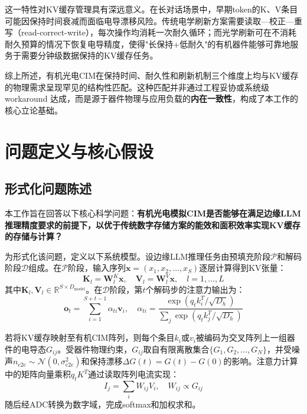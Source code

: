 这一特性对KV缓存管理具有深远意义。在长对话场景中，早期token的K、V条目可能因保持时间衰减而面临电导漂移风险。传统电学刷新方案需要读取—校正—重写（read-correct-write），每次操作均消耗一次耐久循环；而光学刷新可在不消耗耐久预算的情况下恢复电导精度，使得"长保持+低耐久"的有机器件能够可靠地服务于需要分钟级数据保持的KV缓存任务。

综上所述，有机光电CIM在保持时间、耐久性和刷新机制三个维度上均与KV缓存的物理需求呈现罕见的结构性匹配。这种匹配并非通过工程妥协或系统级 workaround 达成，而是源于器件物理与应用负载的\textbf{内在一致性}，构成了本工作的核心立论基础。


\section{问题定义与核心假设}
\label{sec:work2_problem}

\subsection{形式化问题陈述}

本工作旨在回答以下核心科学问题：\textbf{有机光电模拟CIM是否能够在满足边缘LLM推理精度要求的前提下，以优于传统数字存储方案的能效和面积效率实现KV缓存的存储与计算？}

为形式化该问题，定义以下系统模型。设边缘LLM推理任务由预填充阶段$\mathcal{P}$和解码阶段$\mathcal{D}$组成。在$\mathcal{P}$阶段，输入序列$\mathbf{x} = (x_1, x_2, \dots, x_S)$逐层计算得到KV张量：
\begin{equation}
\mathbf{K}_l = \mathbf{W}_l^K \mathbf{x}, \quad \mathbf{V}_l = \mathbf{W}_l^V \mathbf{x}, \quad l = 1, \dots, L
\label{eq:kv_compute}
\end{equation}
其中$\mathbf{K}_l, \mathbf{V}_l \in \mathbb{R}^{S \times D_{\text{model}}}$。在$\mathcal{D}$阶段，第$t$个解码步的注意力输出为：
\begin{equation}
\mathbf{o}_t = \sum_{i=1}^{S+t-1} \alpha_{ti} \mathbf{v}_i, \quad \alpha_{ti} = \frac{\exp(q_t k_i^T / \sqrt{D_h})}{\sum_j \exp(q_t k_j^T / \sqrt{D_h})}
\label{eq:attention_detail}
\end{equation}

若将KV缓存映射至有机CIM阵列，则每个条目$k_i$或$v_i$被编码为交叉阵列上一组器件的电导态$G_{ij}$。受器件物理约束，$G_{ij}$取自有限离散集合$\{G_1, G_2, \dots, G_N\}$，并受噪声$n_{\text{c2c}} \sim \mathcal{N}(0, \sigma_{\text{c2c}}^2)$和保持漂移$\Delta G(t) = G(t) - G(0)$的影响。注意力计算中的矩阵向量乘积$q_t K^T$通过读取阵列电流实现：
\begin{equation}
I_j = \sum_i W_{ij} V_i, \quad W_{ij} \propto G_{ij}
\label{eq:crossbar_mvm}
\end{equation}
随后经ADC转换为数字域，完成softmax和加权求和。


